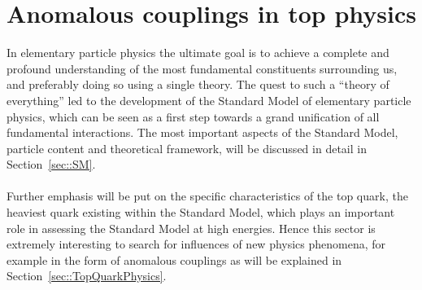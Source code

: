 \chapter{Anomalous couplings in top physics} \label{chp::SM}


In elementary particle physics the ultimate goal is to achieve a complete and profound understanding of the most fundamental constituents surrounding us, and preferably doing so using a single theory.
The quest to such a ``theory of everything'' led to the development of the Standard Model of elementary particle physics, which can be seen as a first step towards a grand unification of all fundamental interactions. %
The most important aspects of the Standard Model, particle content and theoretical framework, will be discussed in detail in Section~\ref{sec::SM}.
\\
\\
Further emphasis will be put on the specific characteristics of the top quark, the heaviest quark existing within the Standard Model, which plays an important role in assessing the Standard Model at high energies. 
Hence this sector is extremely interesting to search for influences of new physics phenomena, for example in the form of anomalous couplings as will be explained in Section~\ref{sec::TopQuarkPhysics}.

